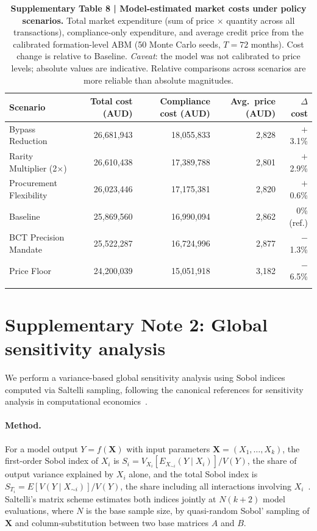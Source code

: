 \documentclass[pdflatex,sn-nature,oneside]{sn-jnl}
\begin{document}
\begin{table}[h]
\caption{%
  \textbf{Supplementary Table 8 | Model-estimated market costs under policy scenarios.}
  Total market expenditure (sum of price $\times$ quantity across all transactions),
  compliance-only expenditure, and average credit price from the calibrated
  formation-level ABM (50 Monte Carlo seeds, $T = 72$ months).
  Cost change is relative to Baseline.
  \textit{Caveat}: the model was not calibrated to price levels; absolute values
  are indicative. Relative comparisons across scenarios are more reliable than
  absolute magnitudes.
}\label{tab:costs}
\begin{tabular}{@{}lrrrr@{}}
\toprule
Scenario & Total cost (AUD) & Compliance cost (AUD) & Avg.\ price (AUD) & $\Delta$ cost \\
\midrule
Bypass Reduction        & 26,681,943 & 18,055,833 & 2,828 & $+$3.1\% \\
Rarity Multiplier (2$\times$) & 26,610,438 & 17,389,788 & 2,801 & $+$2.9\% \\
Procurement Flexibility & 26,023,446 & 17,175,381 & 2,820 & $+$0.6\% \\
Baseline                & 25,869,560 & 16,990,094 & 2,862 & 0\% (ref.) \\
BCT Precision Mandate   & 25,522,287 & 16,724,996 & 2,877 & $-$1.3\% \\
Price Floor             & 24,200,039 & 15,051,918 & 3,182 & $-$6.5\% \\
\botrule
\end{tabular}
\end{table}



\section*{Supplementary Note 2: Global sensitivity analysis}

We perform a variance-based global sensitivity analysis using Sobol
indices computed via Saltelli sampling, following the canonical
references for sensitivity analysis in computational
economics~\cite{SaltelliEtAl2008,HarenbergEtAl2019}.

\paragraph{Method.}
For a model output $Y = f(\mathbf{X})$ with input parameters
$\mathbf{X} = (X_1, \ldots, X_k)$, the first-order Sobol index of $X_i$ is
$S_i = V_{X_i}[E_{X_{\sim i}}(Y \mid X_i)] / V(Y)$, the share of output
variance explained by $X_i$ alone, and the total Sobol index is
$S_{T_i} = E[V(Y \mid X_{\sim i})] / V(Y)$, the share including all
interactions involving $X_i$~\cite{SaltelliEtAl2008}. Saltelli's matrix
scheme estimates both indices jointly at $N(k+2)$ model evaluations,
where $N$ is the base sample size, by quasi-random Sobol' sampling of
$\mathbf{X}$ and column-substitution between two base matrices $A$ and
$B$.
\end{document}
